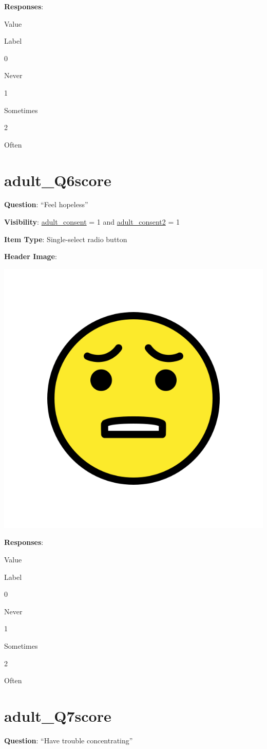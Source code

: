 \documentclass[]{book}
\begin{document}
\textbf{Responses}:

Value

Label

0

Never

1

Sometimes

2

Often

\hypertarget{adult_q6score}{%
\section{adult\_Q6score}\label{adult_q6score}}

\textbf{Question}: ``Feel hopeless''

\textbf{Visibility}: \protect\hyperlink{adult_consent}{adult\_consent} = 1 and \protect\hyperlink{adult_consent2}{adult\_consent2} = 1

\textbf{Item Type}: Single-select radio button

\textbf{Header Image}:

\begin{flushleft}\includegraphics[width=0.33\linewidth]{downloadFigs4latex_HBN_PMHS_Codebook/adult_Q6score_headerImg} \end{flushleft}

\textbf{Responses}:

Value

Label

0

Never

1

Sometimes

2

Often

\hypertarget{adult_q7score}{%
\section{adult\_Q7score}\label{adult_q7score}}

\textbf{Question}: ``Have trouble concentrating''
\end{document}
